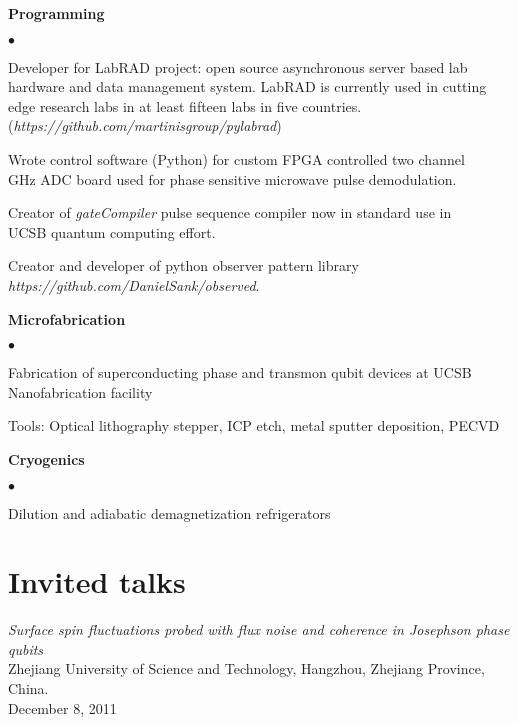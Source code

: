 \documentclass[margin=2cm,line]{res}
\newenvironment{list3}{
  \begin{list}{}{%
      \setlength{\itemsep}{0in}
      \setlength{\parsep}{0in} \setlength{\parskip}{0in}
      \setlength{\topsep}{0in} \setlength{\partopsep}{0in}
      \setlength{\leftmargin}{0.2in}}}{\end{list}}
\newenvironment{list4}{
  \begin{list}{$\bullet$}{%
      \setlength{\itemsep}{0in}
      \setlength{\parsep}{0in} \setlength{\parskip}{0in}
      \setlength{\topsep}{0in} \setlength{\partopsep}{0in}
      \setlength{\leftmargin}{0.2in}}}{\end{list}}
\begin{document}
\begin{resume}
{\bf Programming}\\
\vspace*{-.15in}
\begin{list4}
\item Developer for LabRAD project: open source asynchronous server based lab\\
hardware and data management system. LabRAD is currently used in cutting\\
edge research labs in at least fifteen labs in five countries.\\ (\textit{https://github.com/martinisgroup/pylabrad})
\item Wrote control software (Python) for custom FPGA controlled two channel\\
GHz ADC board used for phase sensitive microwave pulse demodulation.
\item Creator of \emph{gateCompiler} pulse sequence compiler now in standard use in\\
UCSB quantum computing effort.
\item Creator and developer of python observer pattern library \\
\quad \textit{https://github.com/DanielSank/observed}. \\
\end{list4}

\pagebreak

{\bf Microfabrication}\\
\vspace*{-.15in}
\begin{list4}
\item Fabrication of superconducting phase and transmon qubit devices at UCSB Nanofabrication facility
\item Tools: Optical lithography stepper, ICP etch, metal sputter deposition, PECVD
\end{list4}

{\bf Cryogenics}\\
\vspace*{-.15in}
\begin{list4}
\item Dilution and adiabatic demagnetization refrigerators
\end{list4}

\section{\sc Invited talks}
\begin{list3}
\item \textit{Surface spin fluctuations probed with flux noise and coherence in Josephson phase qubits}\\
Zhejiang University of Science and Technology, Hangzhou, Zhejiang Province, China.\\ December 8, 2011
\end{list3}


\end{resume}
\end{document}
